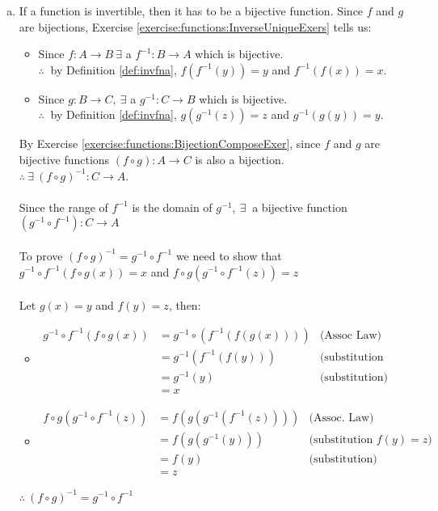 \begin{enumerate}[(a)]
\item \label{InverseIdentityExers-InvOfComp}
If a function is invertible, then it has to be a bijective function. Since $f$ and $g$ are bijections, Exercise \ref{exercise:functions:InverseUniqueExers} tells us:
	\begin{itemize}
	\item
	Since $f\colon A\to B\ \exists$ a $f^{-1}\colon B\to A$ which is bijective.\\
	$\therefore\ $ by Definition \ref{def:invfna}, $f(f^{-1}(y)) = y$ and $f^{-1}(f(x)) = x$.
	
	\item
	Since $g\colon B\to C,\ \exists$ a $g^{-1}\colon C\to B$ which is bijective.\\
	$\therefore\ $ by Definition \ref{def:invfna}, $g(g^{-1}(z)) = z$ and $g^{-1}(g(y)) = y$.
	\end{itemize}

By Exercise \ref{exercise:functions:BijectionComposeExer}, since $f$ and $g$ are bijective functions $(f\circ g)\colon A\to C$ is also a bijection.\\
$\therefore\ \exists\ (f\circ g)^{-1}\colon C\to A$.\\
\\
Since the range of $f^{-1}$ is the domain of $g^{-1},\ \exists\ $ a bijective function $(g^{-1}\circ f^{-1})\colon C\to A$\\
\\
To prove $(f\circ g)^{-1} = g^{-1}\circ f^{-1}$ we need to show that $g^{-1}\circ f^{-1}(f\circ g(x)) = x$ and $f\circ g(g^{-1}\circ f^{-1}(z)) = z$\\
\\
Let $g(x) = y$ and $f(y) = z$, then:
	\begin{itemize}
	\item
	\begin{align*}
	g^{-1}\circ f^{-1}(f\circ g(x)) &= g^{-1}\circ (f^{-1}(f(g(x)))) &\text{(Assoc Law)}\\
	&= g^{-1}(f^{-1}(f(y))) &\text{(substitution g(x))}\\
	&= g^{-1}(y) &\text{(substitution)}\\
	&= x
	\end{align*}

	\item
	\begin{align*}
	f\circ g(g^{-1}\circ f^{-1}(z)) &= f(g(g^{-1}(f^{-1}(z)))) &\text{(Assoc. Law)}\\
	&= f(g(g^{-1}(y))) &\text{(substitution $f(y) = z$)}\\
	&= f(y) &\text{(substitution)}\\
	&= z
	\end{align*}
	\end{itemize}
	$\therefore\ (f\circ g)^{-1} = g^{-1}\circ f^{-1}$
	

\end{enumerate}
